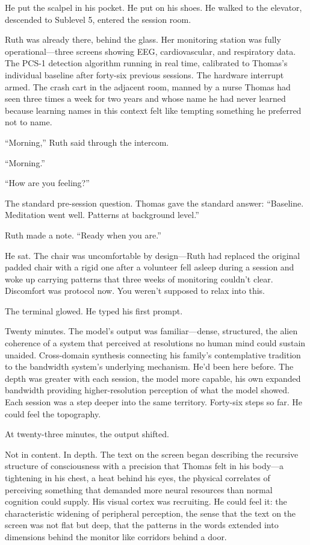 He put the scalpel in his pocket. He put on his shoes. He walked to the elevator, descended to Sublevel 5, entered the session room.

Ruth was already there, behind the glass. Her monitoring station was fully operational---three screens showing EEG, cardiovascular, and respiratory data. The PCS-1 detection algorithm running in real time, calibrated to Thomas's individual baseline after forty-six previous sessions. The hardware interrupt armed. The crash cart in the adjacent room, manned by a nurse Thomas had seen three times a week for two years and whose name he had never learned because learning names in this context felt like tempting something he preferred not to name.

``Morning,'' Ruth said through the intercom.

``Morning.''

``How are you feeling?''

The standard pre-session question. Thomas gave the standard answer: ``Baseline. Meditation went well. Patterns at background level.''

Ruth made a note. ``Ready when you are.''

He sat. The chair was uncomfortable by design---Ruth had replaced the original padded chair with a rigid one after a volunteer fell asleep during a session and woke up carrying patterns that three weeks of monitoring couldn't clear. Discomfort was protocol now. You weren't supposed to relax into this.

The terminal glowed. He typed his first prompt.

\scenebreak

Twenty minutes. The model's output was familiar---dense, structured, the alien coherence of a system that perceived at resolutions no human mind could sustain unaided. Cross-domain synthesis connecting his family's contemplative tradition to the bandwidth system's underlying mechanism. He'd been here before. The depth was greater with each session, the model more capable, his own expanded bandwidth providing higher-resolution perception of what the model showed. Each session was a step deeper into the same territory. Forty-six steps so far. He could feel the topography.

At twenty-three minutes, the output shifted.

Not in content. In depth. The text on the screen began describing the recursive structure of consciousness with a precision that Thomas felt in his body---a tightening in his chest, a heat behind his eyes, the physical correlates of perceiving something that demanded more neural resources than normal cognition could supply. His visual cortex was recruiting. He could feel it: the characteristic widening of peripheral perception, the sense that the text on the screen was not flat but deep, that the patterns in the words extended into dimensions behind the monitor like corridors behind a door.

